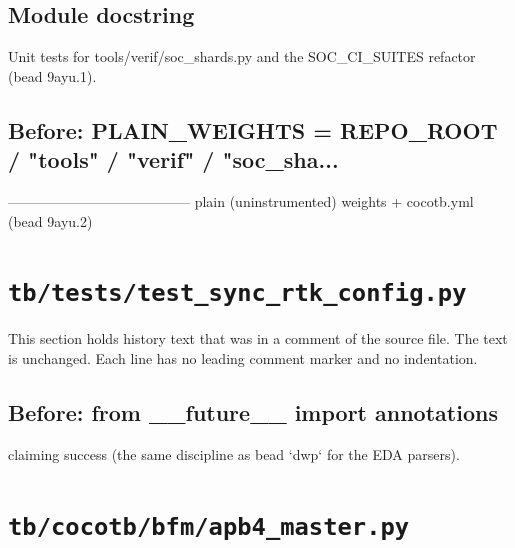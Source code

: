 \begin{record}

\subsection*{Module docstring}

\begin{textblock}
Unit tests for tools/verif/soc_shards.py and the SOC_CI_SUITES refactor (bead 9ayu.1).
\end{textblock}

\subsection*{Before: PLAIN\_WEIGHTS = REPO\_ROOT / "tools" / "verif" / "soc\_sha...}

\begin{textblock}
--------------------------------------- plain (uninstrumented) weights + cocotb.yml (bead 9ayu.2)
\end{textblock}

\end{record}

\section{\texttt{tb/tests/test\_sync\_rtk\_config.py}}\label{cr:suite:test-sync-rtk-config}

This section holds history text that was in a comment of the source file. The text is unchanged. Each line has no leading comment marker and no indentation.

\begin{record}

\subsection*{Before: from \_\_future\_\_ import annotations}

\begin{textblock}
claiming success (the same discipline as bead `dwp` for the EDA parsers).
\end{textblock}

\end{record}

\section{\texttt{tb/cocotb/bfm/apb4\_master.py}}\label{cr:suite:bfm-apb4-master}

